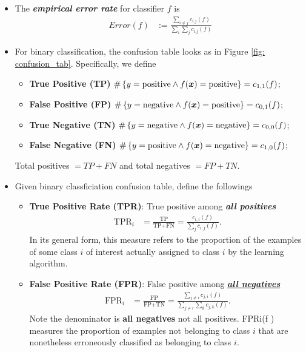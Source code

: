 \documentclass[11pt]{article}
\begin{document}
\begin{itemize}
\item The \textbf{\emph{empirical error rate}} for classifier $f$ is 
\begin{align}
Error(f) &:= \frac{ \sum_{i \neq j} c_{i.j}(f) }{\sum_i \sum_{j} c_{i.j}(f) } \label{eqn: error_rate}
\end{align}


\item For binary classification, the confusion table looks as in Figure \ref{fig: confusion_tab}. Specifically, we define
\begin{itemize}
\item \textbf{True Positive (TP)} $\#\left\{y=\text{positive}  \land  f(\boldsymbol{x}) = \text{positive}\right\} = c_{1,1}(f)$;
\item \textbf{False Positive (FP)} $\#\left\{y=\text{negative} \land  f(\boldsymbol{x}) = \text{positive} \right\} = c_{0,1}(f)$;
\item \textbf{True Negative (TN)} $\#\left\{y=\text{negative}  \land  f(\boldsymbol{x}) = \text{negative}\right\} = c_{0,0}(f)$;
\item \textbf{False Negative (FN)} $\#\left\{y=\text{positive} \land f(\boldsymbol{x}) = \text{negative} \right\} = c_{1,0}(f)$;
\end{itemize} Total positives $= TP + FN$ and total negatives $=FP + TN$.

\item Given binary classficiation confusion table, define the followings
\begin{itemize}
\item \textbf{True Positive Rate (TPR)}: True positive among \emph{\textbf{all positives}} 
\begin{align}
\text{TPR}_{i} &= \frac{\text{TP}}{\text{TP}+ \text{FN}} = \frac{c_{i,i}(f)}{ \sum_{j} c_{i,j}(f) }. \label{eqn: tpr}
\end{align}  In its general form, this measure refers to the proportion of the examples of some class $i$ of interest actually assigned to class $i$ by the learning algorithm.

\item \textbf{False Positive Rate (FPR)}: False positive among \underline{\emph{\textbf{all negatives}}}
\begin{align}
\text{FPR}_{i} &= \frac{\text{FP}}{\text{FP} + \text{TN}} = \frac{\sum_{j\neq i} c_{j,i}(f)}{ \sum_{j\neq i}\sum_{k} c_{j,k}(f) }. \label{eqn: fpr}
\end{align} Note the denominator is \textbf{all negatives} not all positives.  FPRi(f ) measures the proportion of examples not belonging to class $i$
that are nonetheless erroneously classified as belonging to class $i$.


\end{itemize}
\end{itemize}
\end{document}
